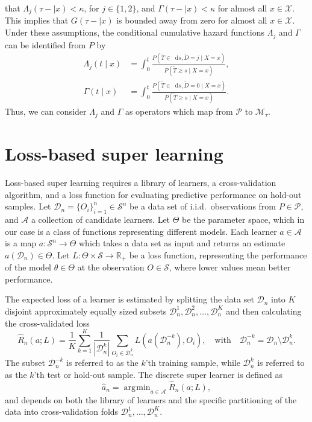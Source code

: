 \documentclass[alpha-refs]{wiley-article}
\newcommand{\R}{\mathbb{R}}
\newcommand*\diff{\mathop{}\!\mathrm{d}}
\newcommand{\1}{\mathbb{1}} %
\DeclareMathOperator*{\argmin}{\arg\!\min}
\newcommand{\data}{\ensuremath{\mathcal{D}}}
\newcommand{\sample}{\ensuremath{\mathcal{S}}}
\begin{document}
that \(\Lambda_{j}(\tau- \mid x)<\kappa \), for \(j\in\{1,2\}\), and
\(\Gamma(\tau- \mid x)<\kappa\) for almost all \(x\in\mathcal
X\). This implies that \(G(\tau- \mid x)\) is bounded away
from zero for almost all \(x\in\mathcal X\).  Under these assumptions,
the conditional cumulative hazard functions \(\Lambda_{j}\) and
\(\Gamma\) can be identified from \(P\) by
\begin{align}
  \Lambda_{j}(t \mid x) &= \int_0^t\frac{  P(\tilde T \in \diff s, \tilde D=j \mid X=x )}{P(\tilde T \geq s \mid X=x )}, \label{eq:lambdaj}\\
  \Gamma(t \mid x) &= \int_0^t\frac{  P(\tilde T \in \diff s, \tilde D=0 \mid X=x )}{P(\tilde T \geq s \mid X=x )}\label{eq:gamma}.
\end{align}
Thus, we can consider $\Lambda_j$ and \(\Gamma\) as operators which map from
\( \mathcal{P} \) to \(\mathcal M_{\tau}\).

\section{Loss-based super learning}
\label{sec:super-learning}

Loss-based super learning requires a library of learners, a
cross-validation algorithm, and a loss function for evaluating
predictive performance on hold-out samples. Let \(
\data_n=\{O_i\}_{i=1}^n \in \sample^n \) be a data set of i.i.d.\
observations from \( P \in \mathcal{P} \), and $\mathcal{A}$ a
collection of candidate learners. Let \(\Theta\) be the parameter
space, which in our case is a class of functions representing
different models. Each learner \(a \in \mathcal{A}\) is a map \( a
\colon \sample^n \rightarrow \Theta \) which takes a data set as
input and returns an estimate $a(\data_n) \in \Theta$. Let \(L\colon
\Theta \times \sample \rightarrow \R_+\) be a loss function,
representing the performance of the model $\theta \in \Theta$ at the
observation \( O \in \sample \), where lower values mean better
performance.

The expected loss of a learner is estimated by splitting the data set
$\data_n$ into $K$ disjoint approximately equally sized subsets
\(\data_n^1, \data_n^2, \dots, \data_n^K \) and then calculating the
cross-validated loss
\begin{equation}
  \label{eq:cv-risk-est}
  \hat{R}_n(a; L) =
  \frac{1}{K}\sum_{k=1}^{K}
  \frac{1}{| \data_n^{k} |}\sum_{O_i \in \data_n^{k}}
  L
  {
    \left(
      a{ (\data_n^{-k})}
      , O_i
    \right)
  },
  \quad \text{with} \quad
  \data_n^{-k} = \data_n \setminus \data_n^{k}.
\end{equation}
The subset \(\data_n^{-k}\) is referred to as the \(k\)'th training
sample, while \(\data_n^{k}\) is referred to as the \(k\)'th test or
hold-out sample.
The discrete super learner is defined as
\begin{equation*}
\hat{a}_n = \argmin_{a\in\mathcal A}\hat{R}_n(a; L),
\end{equation*}
and depends on both the library of learners and the specific
partitioning of the data into cross-validation folds
\( \data_n^1, \dots, \data_n^K \).
\end{document}
